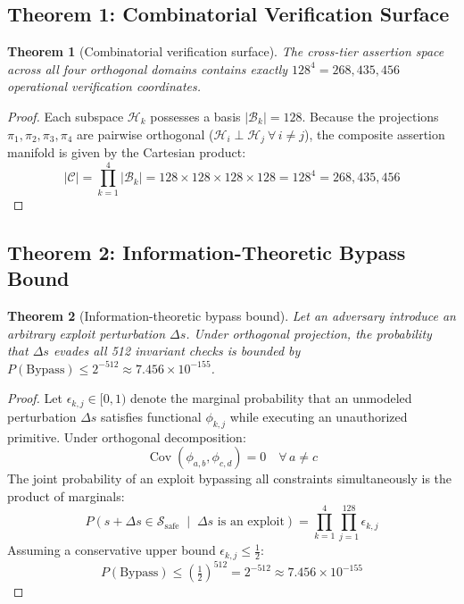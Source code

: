 \documentclass{portalciencia}
\theoremstyle{plain}
\newtheorem{theorem}{Theorem}
\theoremstyle{definition}
\begin{document}
\subsection{Theorem 1: Combinatorial Verification Surface}

\begin{theorem}[Combinatorial verification surface]
The cross-tier assertion space across all four orthogonal domains contains exactly $128^{4} = 268{,}435{,}456$ operational verification coordinates.
\end{theorem}

\begin{proof}
Each subspace $\mathcal{H}_{k}$ possesses a basis $|\mathcal{B}_{k}| = 128$. Because the projections $\pi_1, \pi_2, \pi_3, \pi_4$ are pairwise orthogonal ($\mathcal{H}_{i} \perp \mathcal{H}_{j} \ \forall\, i \ne j$), the composite assertion manifold is given by the Cartesian product:
\begin{equation}
\label{eq:cartesian}
|\mathcal{C}| = \prod_{k=1}^{4} |\mathcal{B}_{k}| = 128 \times 128 \times 128 \times 128 = 128^{4} = 268{,}435{,}456
\end{equation}
\end{proof}

\subsection{Theorem 2: Information-Theoretic Bypass Bound}

\begin{theorem}[Information-theoretic bypass bound]
Let an adversary introduce an arbitrary exploit perturbation $\Delta s$. Under orthogonal projection, the probability that $\Delta s$ evades all 512 invariant checks is bounded by $P(\mathrm{Bypass}) \le 2^{-512} \approx 7.456 \times 10^{-155}$.
\end{theorem}

\begin{proof}
Let $\epsilon_{k,j} \in [0, 1)$ denote the marginal probability that an unmodeled perturbation $\Delta s$ satisfies functional $\phi_{k,j}$ while executing an unauthorized primitive. Under orthogonal decomposition:
\begin{equation}
\label{eq:covariance}
\operatorname{Cov}(\phi_{a,b}, \phi_{c,d}) = 0 \quad \forall\, a \ne c
\end{equation}
The joint probability of an exploit bypassing all constraints simultaneously is the product of marginals:
\begin{equation}
\label{eq:joint}
P\left( s + \Delta s \in \mathcal{S}_{\mathrm{safe}} \;\middle|\; \Delta s \text{ is an exploit} \right) = \prod_{k=1}^{4} \prod_{j=1}^{128} \epsilon_{k,j}
\end{equation}
Assuming a conservative upper bound $\epsilon_{k,j} \le \tfrac{1}{2}$:
\begin{equation}
\label{eq:bypassbound}
P(\mathrm{Bypass}) \le \left( \tfrac{1}{2} \right)^{512} = 2^{-512} \approx 7.456 \times 10^{-155}
\end{equation}
\end{proof}
\end{document}
